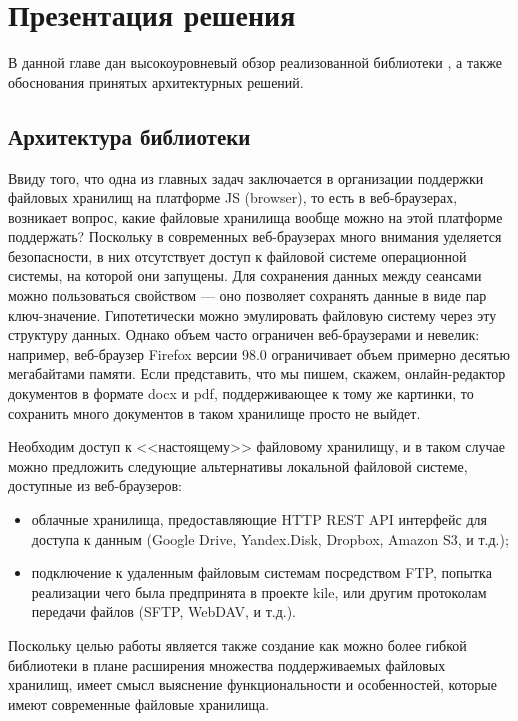 \section{Презентация решения}\label{solution}

В данной главе дан высокоуровневый обзор реализованной библиотеки \cite{gh-multifs}, а также обоснования принятых архитектурных решений.

\subsection{Архитектура библиотеки}
  Ввиду того, что одна из главных задач заключается в организации поддержки файловых хранилищ на платформе JS (browser), то есть в веб-браузерах, возникает вопрос, какие файловые хранилища вообще можно на этой платформе поддержать? Поскольку в современных веб-браузерах много внимания уделяется безопасности, в них отсутствует доступ к файловой системе операционной системы, на которой они запущены. Для сохранения данных между сеансами можно пользоваться свойством \cite{dev-mozilla-localstorage} --- оно позволяет сохранять данные в виде пар ключ-значение. Гипотетически можно эмулировать файловую систему через эту структуру данных. Однако объем  часто ограничен веб-браузерами и невелик: например, веб-браузер Firefox версии 98.0 ограничивает объем  примерно десятью мегабайтами памяти. Если представить, что мы пишем, скажем, онлайн-редактор документов в формате docx и pdf, поддерживающее к тому же картинки, то сохранить много документов в таком хранилище просто не выйдет.

  Необходим доступ к <<настоящему>> файловому хранилищу, и в таком случае можно предложить следующие альтернативы локальной файловой системе, доступные из веб-браузеров:
  \begin{itemize}
    \item облачные хранилища, предоставляющие HTTP REST\cite{rest} API интерфейс для доступа к данным (Google Drive, Yandex.Disk, Dropbox, Amazon S3, и т.д.);
    \item подключение к удаленным файловым системам посредством FTP\cite{ftp}, попытка реализации чего была предпринята в проекте kile\cite{gh-kile}, или другим протоколам передачи файлов (SFTP, WebDAV, и т.д.).
  \end{itemize}

  Поскольку целью работы является также создание как можно более гибкой библиотеки в плане расширения множества поддерживаемых файловых хранилищ, имеет смысл выяснение функциональности и особенностей, которые имеют современные файловые хранилища.


